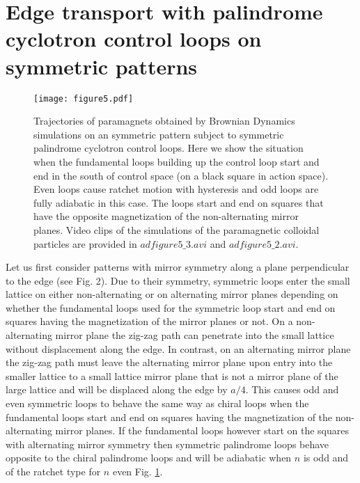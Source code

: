 \documentclass[12pt]{iopart}
\begin{document}
\section{Edge transport with palindrome cyclotron control loops on symmetric patterns}

\begin{figure}
	\texttt{[image: figure5.pdf]}
	\caption{Trajectories of paramagnets obtained by Brownian Dynamics simulations on an symmetric pattern subject to symmetric palindrome cyclotron control loops. Here we show the situation when the fundamental loops building up the control loop start and end in the south of control space (on a black square in action space). Even loops cause ratchet motion with hysteresis and odd loops are fully adiabatic in this case. The loops start and end on squares that have the opposite magnetization of the non-alternating mirror planes. Video clips of the simulations of the paramagnetic colloidal particles are provided in $adfigure5\_3.avi$ and $adfigure5\_2.avi$.}
	\label{fig3}
\end{figure}

Let us first consider patterns with mirror symmetry along a plane perpendicular to the edge (see Fig. 2).
 Due to their symmetry, symmetric loops enter the small lattice on either
non-alternating or on alternating mirror planes depending on whether the fundamental loops used for the symmetric loop start and
end on squares having the magnetization of the mirror planes or not. On a non-alternating mirror plane the zig-zag path can
penetrate into the small lattice without displacement along the edge. In contrast, on an alternating mirror plane the zig-zag
path must leave the alternating mirror plane upon entry into the smaller lattice to a small lattice mirror plane that is not
a mirror plane of the large lattice and will be displaced along the edge by $a/4$. This causes odd and even symmetric loops to behave
the same way as chiral loops when the fundamental loops start and end on squares having the magnetization of the non-alternating mirror planes.
If the fundamental loops however start on the squares with alternating mirror symmetry then symmetric palindrome loops behave opposite to the
chiral palindrome loops and will be adiabatic when $n$ is odd and of the ratchet type for $n$ even Fig. \ref{fig3}. 
\end{document}

